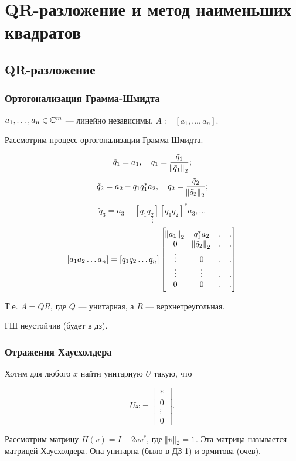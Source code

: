 \section{QR-разложение и метод наименьших квадратов}

\subsection{QR-разложение}

\subsubsection{Ортогонализация Грамма-Шмидта}

$a_1, \dots, a_n \in \mathbb{C}^m$ --- линейно независимы. $A := [a_1, \dots, a_n]$.

Рассмотрим процесс ортогонализации Грамма-Шмидта.

\[
    \tilde{q}_1 = a_1, \quad q_1 = \frac{\tilde{q}_1}{\norm{\tilde{q}_1}_2};
\]
\[
    \tilde{q}_2 = a_2 - q_1 q_1^* a_2,
    \quad q_2 = \frac{\tilde{q}_2}{\norm{\tilde{q}_2}_2};
\]
\[
    \tilde{q}_3 = a_3 - [q_1 q_2] [q_1 q_2]^* a_3, \dots
\]
\[
    \vdots
\]
\[
    [a_1 a_2 \dots a_n] = [q_1 q_2 \dots q_n] \begin{bmatrix}
        \norm{a_1}_2 & q_1^* a_2 & . & . \\
        0 & \norm{\tilde{q}_2}_2 & . & .\\
        \vdots & 0 & . & . \\
        \vdots & \vdots & . & . \\
        0 & 0 & . & .
    \end{bmatrix}
\]

Т.е. $A = Q R$, где $Q$ --- унитарная, а $R$ --- верхнетреугольная.

ГШ неустойчив (будет в дз).

\subsubsection{Отражения Хаусхолдера}

Хотим для любого $x$ найти унитарную $U$ такую, что

\[
    U x = \begin{bmatrix} * \\ 0 \\ \vdots \\ 0 \end{bmatrix}.
\]

Рассмотрим матрицу $H(v) = I - 2 v v^*$, где $\norm{v}_2 = 1$. Эта матрица
называется матрицей Хаусхолдера. Она унитарна (было в ДЗ 1) и эрмитова (очев).

